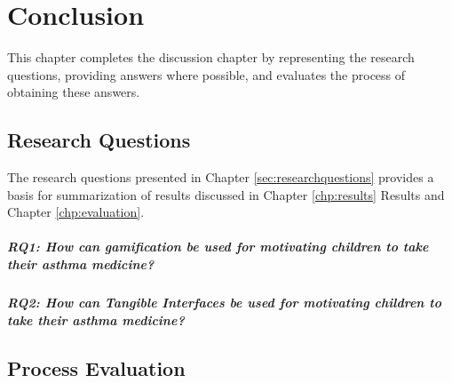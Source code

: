 \chapter{Conclusion}
\label{chp:masterconclusion}

This chapter completes the discussion chapter by representing the research questions, providing answers where possible, and evaluates the process of obtaining these answers. 

\section{Research Questions}

The research questions presented in Chapter \ref{sec:researchquestions} provides a basis for summarization of results discussed in Chapter \ref{chp:results} Results and Chapter \ref{chp:evaluation}. 

\paragraph{RQ1: How can gamification be used for motivating children to take their asthma medicine?}



\paragraph{RQ2: How can Tangible Interfaces be used for motivating children to take their asthma medicine?}



\section{Process Evaluation}